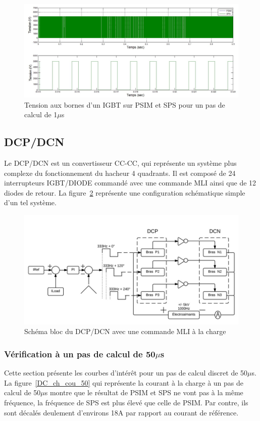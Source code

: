 \documentclass[11pt,letterpaper,final]{report}
\begin{document}
\begin{figure}[htb]
\centering
\includegraphics[scale=0.5]{Fig/Hacheur4Quadrants/HacheurTensionIGBT1u.jpg}
\caption{Tension aux bornes d'un IGBT sur PSIM et SPS pour un pas de calcul de 1$\mu$s}
\label{hc_IG_ten_1}
\end{figure}


\clearpage

\subsection{DCP/DCN}
Le DCP/DCN est un convertisseur CC-CC, qui représente un système plus complexe du fonctionnement du hacheur 4 quadrants. Il est composé de 24 interrupteurs IGBT/DIODE commandé avec une commande MLI ainsi que de 12 diodes de retour. La figure~\ref{DC_DP} représente une configuration schématique simple d'un tel système.

\begin{figure}[htb]
\centering
\includegraphics[scale=0.5]{Fig/DCPDCN/DCP.jpg}
\caption{Schéma bloc du DCP/DCN avec une commande MLI à la charge}
\label{DC_DP}
\end{figure}

\subsubsection{Vérification à un pas de calcul de 50$\mu$s}
Cette section présente les courbes d'intérêt pour un pas de calcul discret de 50$\mu$s. La figure~\ref{DC_ch_cou_50} qui représente la courant à la charge à un pas de calcul de 50$\mu$s montre que le résultat de PSIM et SPS ne vont pas à la même fréquence, la fréquence de SPS est plus élevé que celle de PSIM. Par contre, ils sont décalés deulement d'environs 18A par rapport au courant de référence.
\end{document}
